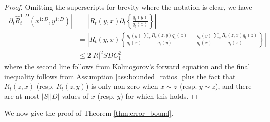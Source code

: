 \documentclass{article}
\begin{document}
\begin{proof} Omitting the superscripts for brevity where the notation is clear, we have
\begin{align}
    \left| \partial_t \hat R_t^{1:D}(x^{1:D},y^{1:D}) \right| &= \left| R_t(y, x) \partial_t \left\{ \frac{q_t(y)}{q_t(x)} \right\} \right| \\
    &= \left| R_t(y, x) \left\{ \frac{q_t(y)}{q_t(x)} \frac{\sum_{z} R_t(z,y) q_t(z)}{q_t(y)} - \frac{q_t(y)}{q_t(x)}\frac{\sum_{z} R_t(z,x) q_t(z)}{q_t(x)} \right\} \right| \\
    &\leq 2|R|^2 SD C_1^2
\end{align}
where the second line follows from Kolmogorov's forward equation and the final inequality follows from Assumption \ref{ass:bounded_ratios} plus the fact that $R_t(z,x)$ (resp. $R_t(z,y)$) is only non-zero when $x \sim z$ (resp. $y \sim z$), and there are at most $|S||D|$ values of $x$ (resp. $y$) for which this holds.
\end{proof}

We now give the proof of Theorem \ref{thm:error_bound}.
\end{document}
